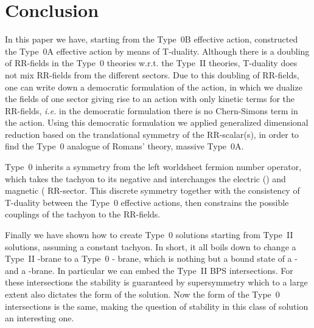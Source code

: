\documentclass[12pt,a4paper]{article}
\begin{document}
\section{Conclusion}
%
In this paper we have, starting from the Type~0B effective action,
constructed the Type~0A effective action by means of T-duality.
Although there is a doubling of RR-fields in the Type~0 theories
w.r.t.  the Type~II theories, T-duality does not mix RR-fields from
the different sectors.  Due to this doubling of RR-fields, one can
write down a democratic formulation of the action, in which we dualize
the fields of one sector giving rise to an action with only kinetic
terms for the RR-fields, {\em i.e.} in the democratic formulation
there is no Chern-Simons term in the action. Using this democratic
formulation we applied generalized dimensional reduction based on the
translational symmetry of the RR-scalar(s), in order to find the
Type~0 analogue of Romans' theory, massive Type~0A.
\par
Type~0 inherits a \coordHE{} symmetry from the left worldsheet
fermion number operator, which takes the tachyon to its negative and
interchanges the electric (\myHighlight{$^{+}$}\coordHE{}) and magnetic (\myHighlight{$^{-})$}\coordHE{} RR-sector.
This discrete symmetry together with the consistency of T-duality
between the Type~0 effective actions, then constrains the possible
couplings of the tachyon to the RR-fields.
\par
Finally we have shown how to create Type~0 solutions starting from
Type~II solutions, assuming a constant tachyon. In short, it all boils
down to change a Type~II \coordHE{}-brane to a Type~0 \coordHE{}- brane,
which is nothing but a bound state of a \coordHE{}- and a
\coordHE{}-brane. In particular we can embed the Type~II BPS
intersections.  For these intersections the stability is guaranteed by
supersymmetry which to a large extent also dictates the form of the
solution.  Now the form of the Type~0 intersections is the same,
making the question of stability in this class of solution an
interesting one.
\end{document}
